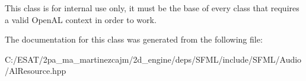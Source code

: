 This class is for internal use only, it must be the base of every class that requires a valid Open\+AL context in order to work. 

The documentation for this class was generated from the following file\+:\begin{DoxyCompactItemize}
\item 
C\+:/\+E\+S\+A\+T/2pa\+\_\+ma\+\_\+martinezcajm/2d\+\_\+engine/deps/\+S\+F\+M\+L/include/\+S\+F\+M\+L/\+Audio/Al\+Resource.\+hpp\end{DoxyCompactItemize}
